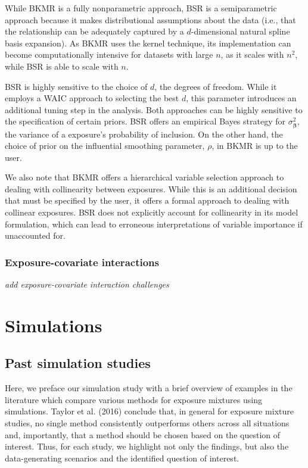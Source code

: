 \documentclass[12pt, twoside]{amherstthesis}
\begin{document}
While BKMR is a fully nonparametric approach, BSR is a semiparametric approach because it makes distributional assumptions about the data (i.e., that the relationship can be adequately captured by a \(d\)-dimensional natural spline basis expansion). As BKMR uses the kernel technique, its implementation can become computationally intensive for datasets with large \(n\), as it scales with \(n^2\), while BSR is able to scale with \(n\).

BSR is highly sensitive to the choice of \(d\), the degrees of freedom. While it employs a WAIC approach to selecting the best \(d\), this parameter introduces an additional tuning step in the analysis. Both approaches can be highly sensitive to the specification of certain priors. BSR offers an empirical Bayes strategy for \(\sigma^2_{\boldsymbol\beta}\), the variance of a exposure's probability of inclusion. On the other hand, the choice of prior on the influential smoothing parameter, \(\rho\), in BKMR is up to the user.

We also note that BKMR offers a hierarchical variable selection approach to dealing with collinearity between exposures. While this is an additional decision that must be specified by the user, it offers a formal approach to dealing with collinear exposures. BSR does not explicitly account for collinearity in its model formulation, which can lead to erroneous interpretations of variable importance if unaccounted for.

\hypertarget{exposure-covariate-interactions}{%
\subsection{Exposure-covariate interactions}\label{exposure-covariate-interactions}}

\emph{add exposure-covariate interaction challenges}

\hypertarget{sims}{%
\chapter{Simulations}\label{sims}}

\hypertarget{past-simulation-studies}{%
\section{Past simulation studies}\label{past-simulation-studies}}

Here, we preface our simulation study with a brief overview of examples in the literature which compare various methods for exposure mixtures using simulations. Taylor et al. (2016) conclude that, in general for exposure mixture studies, no single method consistently outperforms others across all situations and, importantly, that a method should be chosen based on the question of interest. Thus, for each study, we highlight not only the findings, but also the data-generating scenarios and the identified question of interest.
\end{document}
